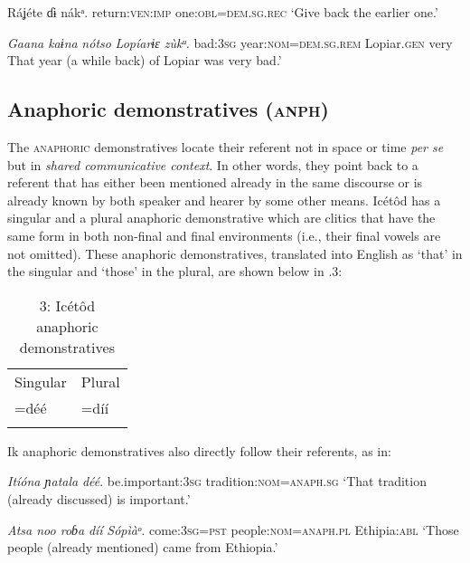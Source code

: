 Ráʝéte     ɗɨ nákᵃ.
return:\textsc{ven:imp}   one:\textsc{obl=dem.sg.rec}
‘Give back the earlier one.’




\textit{Gaana   kaɨna} \textit{nótso}\textit{       Lopíarɨɛ     zùkᵘ.}
bad:\textsc{3sg}   year:\textsc{nom}=\textsc{dem.sg.rem}   Lopiar.\textsc{gen} very
That year (a while back) of Lopiar was very bad.’






\subsection{Anaphoric demonstratives (\textsc{anph})}


The \textsc{anaphoric} demonstratives locate their referent not in space or time \textit{per se} but in \textit{shared communicative context}. In other words, they point back to a referent that has either been mentioned already in the same discourse or is already known by both speaker and hearer by some other means. Icétôd has a singular and a plural anaphoric demonstrative which are clitics that have the same form in both non-final and final environments (i.e., their final vowels are not omitted). These anaphoric demonstratives, translated into English as ‘that’ in the singular and ‘those’ in the plural, are shown below in .3:


\begin{table}
\caption{3: Icétôd anaphoric demonstratives}
\label{tab:6}


\begin{tabularx}{\textwidth}{XX}
\lsptoprule

Singular & Plural\\
=déé & =díí\\
\lspbottomrule
\end{tabularx}
\end{table}
Ik anaphoric demonstratives also directly follow their referents, as in:




\textit{Itíóna     ɲatala} \textit{déé}.
be.important:\textsc{3sg}   tradition:\textsc{nom}=\textsc{anaph.sg}
‘That tradition (already discussed) is important.’




\textit{Atsa noo     roɓa} \textit{díí}\textit{            Sópìàᵒ.}
come:\textsc{3sg}=\textsc{pst}   people:\textsc{nom}=\textsc{anaph.pl}  Ethipia:\textsc{abl}
‘Those people (already mentioned) came from Ethiopia.’






